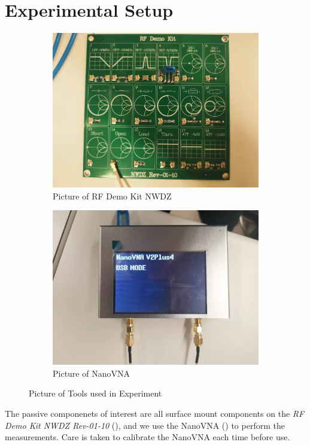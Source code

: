 \documentclass{article}
\begin{document}
\section{Experimental Setup}
\begin{figure}[h]
    \centering
    \begin{subfigure}{.5\linewidth}
        \centering
        \includegraphics[width=.8\linewidth]{./pics/test_loads.jpg}
        \caption{Picture of RF Demo Kit NWDZ}
        \label{fig:test_loads}
    \end{subfigure}%
    \begin{subfigure}{.5\linewidth}
        \centering
        \includegraphics[width=.8\linewidth]{./pics/NanoVNA.jpg}
        \caption{Picture of NanoVNA}
        \label{fig:nanovna}
    \end{subfigure}
    \caption{Picture of Tools used in Experiment}
\end{figure}

The passive componenets of interest are all surface mount components on the \emph{RF Demo Kit NWDZ Rev-01-10} (), and
we use the NanoVNA () to perform the measurements.
Care is taken to calibrate the NanoVNA each time before use.
\end{document}
